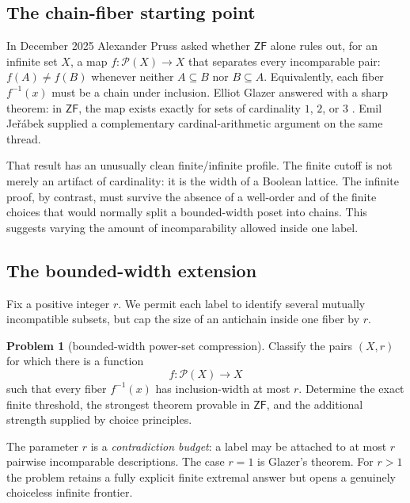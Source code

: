 \documentclass[11pt,letterpaper]{article}
\numberwithin{equation}{section}
\theoremstyle{plain}
\theoremstyle{definition}
\newtheorem{problem}[problem]{Problem}
\theoremstyle{remark}
\newcommand{\Pow}{\mathcal P}
\newcommand{\ZF}{\mathsf{ZF}}
\begin{document}
\subsection{The chain-fiber starting point}
In December 2025 Alexander Pruss asked whether $\ZF$ alone rules out, for an
infinite set $X$, a map $f:\Pow(X)\to X$ that separates every incomparable
pair: $f(A)\neq f(B)$ whenever neither $A\subseteq B$ nor $B\subseteq A$.
Equivalently, each fiber $f^{-1}(x)$ must be a chain under inclusion.  Elliot
Glazer answered with a sharp theorem: in $\ZF$, the map exists exactly for
sets of cardinality $1$, $2$, or $3$ \cite{PrussGlazer2025}.  Emil
Je\v{r}\'abek supplied a complementary cardinal-arithmetic argument on the
same thread.

That result has an unusually clean finite/infinite profile.  The finite cutoff
is not merely an artifact of cardinality: it is the width of a Boolean
lattice.  The infinite proof, by contrast, must survive the absence of a
well-order and of the finite choices that would normally split a bounded-width
poset into chains.  This suggests varying the amount of incomparability
allowed inside one label.

\subsection{The bounded-width extension}
Fix a positive integer $r$.  We permit each label to identify several
mutually incompatible subsets, but cap the size of an antichain inside one
fiber by $r$.

\begin{problem}[bounded-width power-set compression]\label{bwc:prob:main}
Classify the pairs $(X,r)$ for which there is a function
\[
 f:\Pow(X)\longrightarrow X
\]
such that every fiber $f^{-1}(x)$ has inclusion-width at most $r$.
Determine the exact finite threshold, the strongest theorem provable in
$\ZF$, and the additional strength supplied by choice principles.
\end{problem}

The parameter $r$ is a \emph{contradiction budget}: a label may be attached to
at most $r$ pairwise incomparable descriptions.  The case $r=1$ is Glazer's
theorem.  For $r>1$ the problem retains a fully explicit finite extremal
answer but opens a genuinely choiceless infinite frontier.
\end{document}
